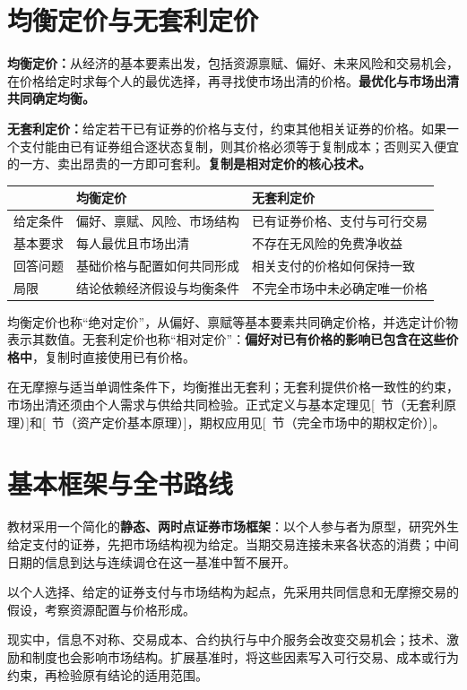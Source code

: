 \section{均衡定价与无套利定价}
\label{sec:wj-one-2}
\begin{tcolorbox}[knowledge,title=两种定价方法]
\textbf{均衡定价：}从经济的基本要素出发，包括资源禀赋、偏好、未来风险和交易机会，在价格给定时求每个人的最优选择，再寻找使市场出清的价格。\textbf{最优化与市场出清共同确定均衡。}

\textbf{无套利定价：}给定若干已有证券的价格与支付，约束其他相关证券的价格。如果一个支付能由已有证券组合逐状态复制，则其价格必须等于复制成本；否则买入便宜的一方、卖出昂贵的一方即可套利。\textbf{复制是相对定价的核心技术。}
\end{tcolorbox}

\noindent\begin{tabularx}{\linewidth}{@{}lXX@{}}
\toprule
 & 均衡定价 & 无套利定价\\
\midrule
给定条件 & 偏好、禀赋、风险、市场结构 & 已有证券价格、支付与可行交易\\
基本要求 & 每人最优且市场出清 & 不存在无风险的免费净收益\\
回答问题 & 基础价格与配置如何共同形成 & 相关支付的价格如何保持一致\\
局限 & 结论依赖经济假设与均衡条件 & 不完全市场中未必确定唯一价格\\
\bottomrule
\end{tabularx}

均衡定价也称“绝对定价”，从偏好、禀赋等基本要素共同确定价格，并选定计价物表示其数值。无套利定价也称“相对定价”：\textbf{偏好对已有价格的影响已包含在这些价格中}，复制时直接使用已有价格。

在无摩擦与适当单调性条件下，均衡推出无套利；无套利提供价格一致性的约束，市场出清还须由个人需求与供给共同检验。正式定义与基本定理见[~节（无套利原理）]和[~节（资产定价基本原理）]，期权应用见[~节（完全市场中的期权定价）]。


\section{基本框架与全书路线}
\label{sec:wj-one-3}
教材采用一个简化的\textbf{静态、两时点证券市场框架}：以个人参与者为原型，研究外生给定支付的证券，先把市场结构视为给定。当期交易连接未来各状态的消费；中间日期的信息到达与连续调仓在这一基准中暂不展开。

\begin{tcolorbox}[knowledge,title=基准框架]
以个人选择、给定的证券支付与市场结构为起点，先采用共同信息和无摩擦交易的假设，考察资源配置与价格形成。
\end{tcolorbox}
现实中，信息不对称、交易成本、合约执行与中介服务会改变交易机会；技术、激励和制度也会影响市场结构。扩展基准时，将这些因素写入可行交易、成本或行为约束，再检验原有结论的适用范围。

